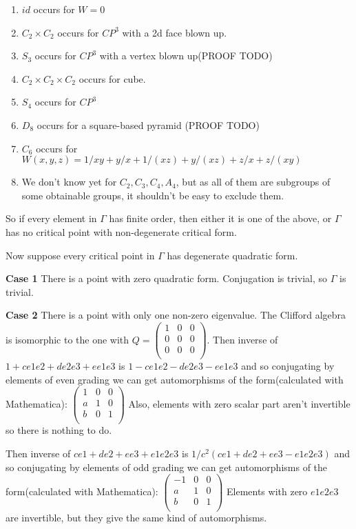 \documentclass[a4paper]{article}
\begin{document}
\begin{enumerate}
	\item $id$ occurs for $W = 0$
	\item $C_2 \times C_2$ occurs for $CP^3$ with a 2d face blown up.
	\item $S_3$ occurs for $CP^3$ with a vertex blown up(PROOF TODO)
	\item $C_2 \times C_2 \times C_2$ occurs for cube.
	\item $S_4$ occurs for $CP^3$
	\item $D_8$ occurs for a square-based pyramid (PROOF TODO)
	\item $C_6$ occurs for $W(x,y,z)= 1/x y+y/x+1/(x z)+y/(x z)+ z/x+z/(x y)$
	\item We don't know yet for $C_2, C_3, C_4, A_4$, but as all of them are subgroups of some obtainable groups, it shouldn't be easy to exclude them.
\end{enumerate}
So if every element in $\Gamma$ has finite order, then either it is one of the above, or $\Gamma$ has no critical point with non-degenerate critical form.

Now suppose every critical point in $\Gamma$ has degenerate quadratic form.


\textbf{Case 1} There is a point with zero quadratic form.
Conjugation is trivial, so $\Gamma$ is trivial.

\textbf{Case 2} There is a point with only one non-zero eigenvalue.
The Clifford algebra is isomorphic to the one with $Q= \begin{pmatrix}
	1 & 0 &0 \\ 
	0 & 0 &0\\
	0 & 0 &0\\
\end{pmatrix}$.
Then inverse of $1+c e1e2+d e2e3+ e e1e3$ is $1-c e1e2-d e2e3- e e1e3$ and so conjugating by elements of even grading we can get automorphisms of the form(calculated with Mathematica):
$ \begin{pmatrix}
1 & 0 &0 \\ 
a & 1 & 0\\
b & 0 &  1\\
\end{pmatrix}$
Also, elements with zero scalar part aren't invertible so there is nothing to do.

Then inverse of $ce1+de2+ e e3+ e1e2e3$ is $1/c^2(ce1+de2+ e e3- e1e2e3)$ and so conjugating by elements of odd grading we can get automorphisms of the form(calculated with Mathematica):
$ \begin{pmatrix}
-1 & 0 &0 \\ 
a & 1 & 0\\
b & 0 &  1\\
\end{pmatrix}$
Elements with zero $e1e2e3$ are invertible, but they give the same kind of automorphisms.
\end{document}

